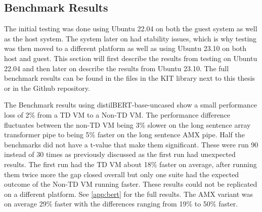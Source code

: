 \subsection{Benchmark Results}
The initial testing was done using Ubuntu 22.04 on both the guest system as well as the host system. The system later on had stability issues, which is why testing was then moved to a different platform as well as using Ubuntu 23.10 on both host and guest. This section will first describe the results from testing on Ubuntu 22.04 and then later on describe the results from Ubuntu 23.10. The full benchmark results can be found in the files in the KIT library next to this thesis or in the Github repository.


The Benchmark results using distilBERT-base-uncased show a small performance loss of 2\% from a TD VM to a Non-TD VM. The performance difference fluctuates between the non-TD VM being 3\% slower on the long sentence array transformer pipe to being 5\% faster on the long sentence AMX pipe. Half the benchmarks did not have a t-value that make them significant. These were run 90 instead of 30 times as previously discussed as the first run had unexpected results. The first run had the TD VM about 18\% faster on average, after running them twice more the gap closed overall but only one suite had the expected outcome of the Non-TD VM running faster. These results could not be replicated on a different platform. See \ref{app:bert} for the full results. The AMX variant was on average 29\% faster with the differences ranging from 19\% to 50\% faster.


